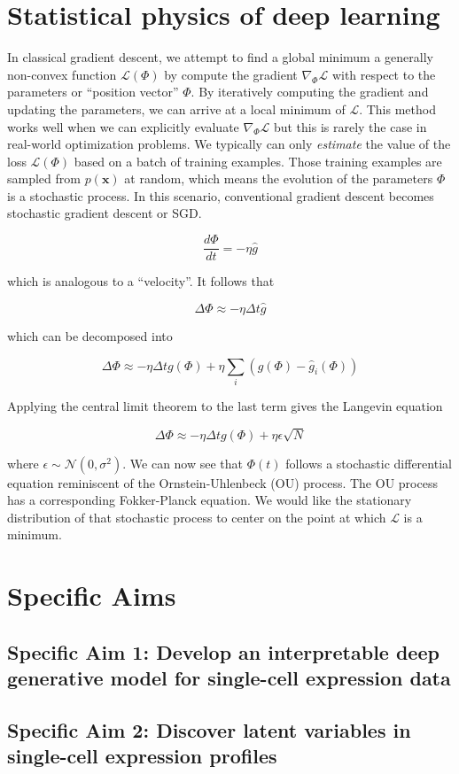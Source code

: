 \documentclass{article}
\begin{document}
\section{Statistical physics of deep learning}



In classical gradient descent, we attempt to find a global minimum a generally non-convex function $\mathcal{L}(\Phi)$ by compute the gradient $\nabla_{\Phi} \mathcal{L}$ with respect to the parameters or ``position vector'' $\Phi$. By iteratively computing the gradient and updating the parameters, we can arrive at a local minimum of $\mathcal{L}$. This method works well when we can explicitly evaluate $\nabla_{\Phi} \mathcal{L}$ but this is rarely the case in real-world optimization problems. We typically can only \emph{estimate} the value of the loss $\mathcal{L}(\Phi)$ based on a batch of training examples. Those training examples are sampled from $p(\mathbf{x})$ at random, which means the evolution of the parameters $\Phi$ is a stochastic process. In this scenario, conventional gradient descent becomes stochastic gradient descent or SGD. 

\begin{equation*}
\frac{d\Phi}{dt} = - \eta \hat{g}
\end{equation*}

which is analogous to a ``velocity''. It follows that 


\begin{equation*}
\Delta\Phi \approx - \eta \Delta t \hat{g}
\end{equation*}

which can be decomposed into 

\begin{equation*}
\Delta\Phi \approx - \eta \Delta t g(\Phi) + \eta \sum_{i} (g(\Phi) - \hat{g}_{i}(\Phi))
\end{equation*}

Applying the central limit theorem to the last term gives the Langevin equation

\begin{equation*}
\Delta\Phi \approx - \eta \Delta t g(\Phi) + \eta \epsilon \sqrt{N}
\end{equation*}

where $\epsilon \sim \mathcal{N}(0,\sigma^{2})$. We can now see that $\Phi(t)$ follows a stochastic differential equation reminiscent of the Ornstein-Uhlenbeck (OU) process. The OU process has a corresponding Fokker-Planck equation. We would like the stationary distribution of that stochastic process to center on the point at which $\mathcal{L}$ is a minimum.



\section{Specific Aims}

\subsection{Specific Aim 1: Develop an interpretable deep generative model for single-cell expression data}


\subsection{Specific Aim 2: Discover latent variables in single-cell expression profiles   }
\end{document}
